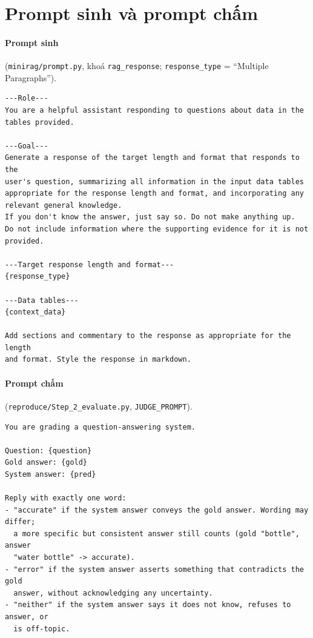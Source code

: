 \section{Prompt sinh và prompt chấm}\label{app:prompts}

\paragraph{Prompt sinh} (\texttt{minirag/prompt.py}, khoá \texttt{rag\_response}; \texttt{response\_type} = ``Multiple Paragraphs'').
\begin{small}
\begin{verbatim}
---Role---
You are a helpful assistant responding to questions about data in the
tables provided.

---Goal---
Generate a response of the target length and format that responds to the
user's question, summarizing all information in the input data tables
appropriate for the response length and format, and incorporating any
relevant general knowledge.
If you don't know the answer, just say so. Do not make anything up.
Do not include information where the supporting evidence for it is not
provided.

---Target response length and format---
{response_type}

---Data tables---
{context_data}

Add sections and commentary to the response as appropriate for the length
and format. Style the response in markdown.
\end{verbatim}
\end{small}

\paragraph{Prompt chấm} (\texttt{reproduce/Step\_2\_evaluate.py}, \texttt{JUDGE\_PROMPT}).
\begin{small}
\begin{verbatim}
You are grading a question-answering system.

Question: {question}
Gold answer: {gold}
System answer: {pred}

Reply with exactly one word:
- "accurate" if the system answer conveys the gold answer. Wording may differ;
  a more specific but consistent answer still counts (gold "bottle", answer
  "water bottle" -> accurate).
- "error" if the system answer asserts something that contradicts the gold
  answer, without acknowledging any uncertainty.
- "neither" if the system answer says it does not know, refuses to answer, or
  is off-topic.
\end{verbatim}
\end{small}

